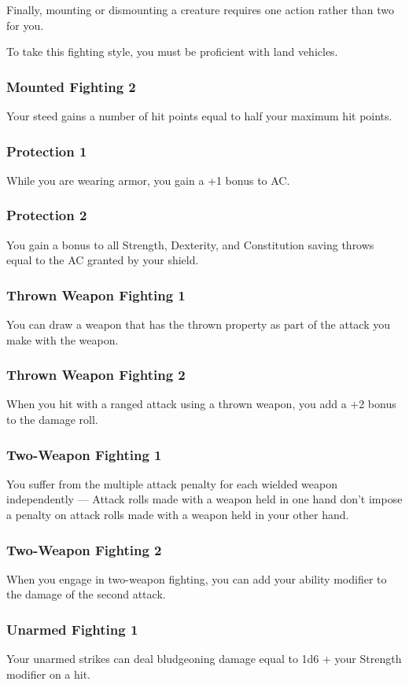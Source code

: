         Finally, mounting or dismounting a creature requires one action rather than two for you.

        To take this fighting style, you must be proficient with land vehicles.
    \subsubsection{Mounted Fighting 2}
        Your steed gains a number of hit points equal to half your maximum hit points.
    \subsubsection{Protection 1}
        While you are wearing armor, you gain a +1 bonus to AC.
    \subsubsection{Protection 2}
        You gain a bonus to all Strength, Dexterity, and Constitution saving throws equal to the AC granted by your shield.
    \subsubsection{Thrown Weapon Fighting 1}
        You can draw a weapon that has the thrown property as part of the attack you make with the weapon.
    \subsubsection{Thrown Weapon Fighting 2}
        When you hit with a ranged attack using a thrown weapon, you add a +2 bonus to the damage roll.
    \subsubsection{Two-Weapon Fighting 1}
        You suffer from the multiple attack penalty for each wielded weapon independently --- Attack rolls made with a weapon held in one hand don't impose a penalty on attack rolls made with a weapon held in your other hand.
    \subsubsection{Two-Weapon Fighting 2}
        When you engage in two-weapon fighting, you can add your ability modifier to the damage of the second attack.
    \subsubsection{Unarmed Fighting 1}
        Your unarmed strikes can deal bludgeoning damage equal to 1d6 + your Strength modifier on a hit.


